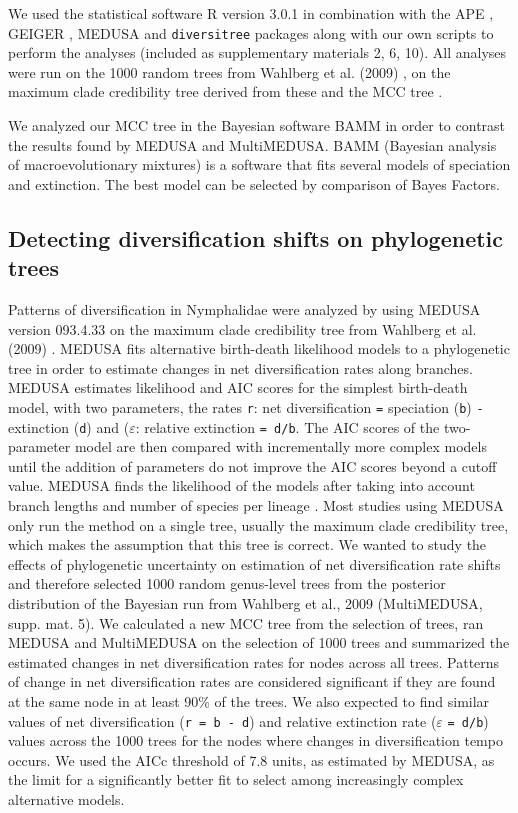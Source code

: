 \documentclass[10pt]{article}
\begin{document}
We used the statistical software R version 3.0.1 \cite{r2013} in combination
with the APE \cite{popescu2012}, GEIGER \cite{harmon2008}, MEDUSA 
\cite{alfaro2009} and
\texttt{diversitree} \cite{fitzjohn2012} packages along with our own scripts to
perform the analyses (included as supplementary materials 2, 6, 10). All
analyses were run on the 1000 random trees from Wahlberg et al. (2009)
\cite{wahlberg2009}, on the maximum clade credibility tree derived from these and
the MCC tree \cite{wahlberg2009}.

We analyzed our MCC tree in the Bayesian software BAMM in order to contrast
the results
found by MEDUSA and MultiMEDUSA.
BAMM (Bayesian analysis of macroevolutionary mixtures)
\cite{rabosky2014} is a
software that fits several models of speciation and extinction. The best model
can be selected by comparison of Bayes Factors.

\subsection*{Detecting diversification shifts on phylogenetic trees}

Patterns of diversification in Nymphalidae were analyzed by using MEDUSA
version 093.4.33 \cite{alfaro2009} on the maximum clade credibility tree from
Wahlberg et al. (2009) \cite{wahlberg2009}. MEDUSA fits alternative birth-death
likelihood models to a phylogenetic tree in order to estimate changes in
net diversification rates along branches. MEDUSA estimates likelihood
and AIC scores for the simplest birth-death model, with two parameters,
the rates \texttt{r}: net diversification \texttt{=} speciation
(\texttt{b}) \texttt{-} extinction (\texttt{d}) and ($\varepsilon$:
relative extinction \texttt{= d/b}. The AIC scores of the two-parameter
model are then compared with incrementally more complex models until the
addition of parameters do not improve the AIC scores beyond a cutoff
value. MEDUSA finds the likelihood of the models after taking into
account branch lengths and number of species per lineage 
\cite{alfaro2009}. Most
studies using MEDUSA only run the method on a single tree, usually the
maximum clade credibility tree, which makes the assumption that this
tree is correct. We wanted to study the effects of phylogenetic
uncertainty on estimation of net diversification rate shifts and
therefore selected 1000 random genus-level trees from the posterior
distribution of the Bayesian run from Wahlberg et al., 2009 \cite{wahlberg2009}
(MultiMEDUSA, supp. mat. 5). We calculated a new MCC tree from the
selection of trees, ran MEDUSA and MultiMEDUSA on the selection of 1000
trees and summarized the estimated changes in net diversification rates
for nodes across all trees. Patterns of change in net diversification
rates are considered significant if they are found at the same node in
at least 90\% of the trees. We also expected to find similar values of
net diversification (\texttt{r = b - d}) and relative extinction rate
($\varepsilon$ \texttt{= d/b}) values across the 1000 trees for the
nodes where changes in diversification tempo occurs. We used the AICc
threshold of 7.8 units, as estimated by MEDUSA, as the limit for a
significantly better fit to select among increasingly complex
alternative models.
\end{document}

